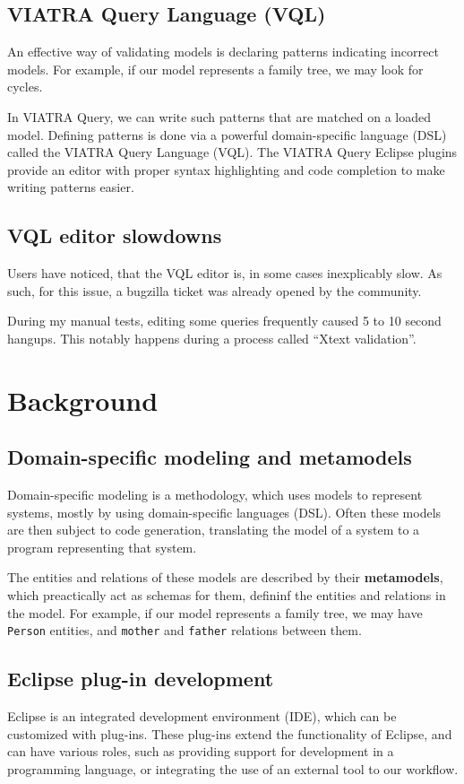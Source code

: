 \documentclass[11pt,a4paper,oneside]{report}
\begin{document}
\pagebreak
\section{VIATRA Query Language (VQL)}
An effective way of validating models is declaring patterns indicating incorrect
models. For example, if our model represents a family tree, we may look for
cycles.

In VIATRA Query, we can write such patterns that are matched on a loaded model.
Defining patterns is done via a powerful domain-specific language (DSL) called
the VIATRA Query Language (VQL). The VIATRA Query Eclipse plugins provide an
editor with proper syntax highlighting and code completion to make writing
patterns easier.

\section{VQL editor slowdowns}
Users have noticed, that the VQL editor is, in some cases inexplicably slow.
As such, for this issue, a bugzilla ticket was already opened by the
community\cite{bugzilla-ticket}.

During my manual tests, editing some queries frequently caused 5 to 10 second
hangups. This notably happens during a process called ``Xtext validation''.

\chapter{Background}

\section{Domain-specific modeling and metamodels}
Domain-specific modeling is a methodology, which uses models to represent
systems, mostly by using domain-specific languages (DSL). Often these models
are then subject to code generation, translating the model of a system to a
program representing that system.

The entities and relations of these models are described by their
\textbf{metamodels}, which preactically act as schemas for them, defininf the
entities and relations in the model. For example, if our model represents a
family tree, we may have \texttt{Person} entities, and \texttt{mother} and
\texttt{father} relations between them.

\section{Eclipse plug-in development}
Eclipse is an integrated development environment (IDE), which can be customized
with plug-ins. These plug-ins extend the functionality of Eclipse, and can have
various roles, such as providing support for development in a programming
language, or integrating the use of an external tool to our workflow.
\end{document}

